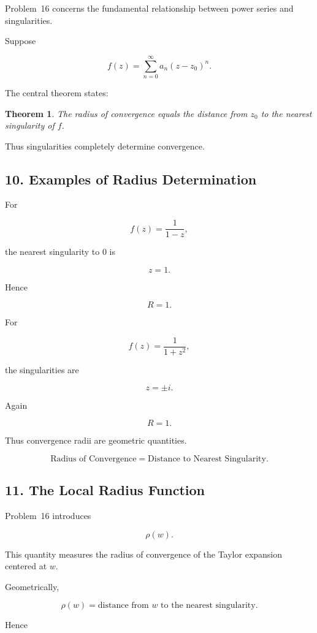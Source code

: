 \documentclass[12pt,a4paper]{article}
\newtheorem{theorem}{Theorem}[section]
\theoremstyle{notespace}
\begin{document}
Problem~16 concerns the fundamental relationship between power series and singularities.

Suppose

\[
f(z)
=
\sum_{n=0}^{\infty}
a_n(z-z_0)^n.
\]

The central theorem states:

\begin{theorem}
	The radius of convergence equals the distance from \(z_0\) to the nearest singularity of \(f\).
\end{theorem}

Thus singularities completely determine convergence.

\bigskip

\subsection{10. Examples of Radius Determination}

For

\[
f(z)=\frac1{1-z},
\]

the nearest singularity to \(0\) is

\[
z=1.
\]

Hence

\[
R=1.
\]

For

\[
f(z)=\frac1{1+z^2},
\]

the singularities are

\[
z=\pm i.
\]

Again

\[
R=1.
\]

Thus convergence radii are geometric quantities.

\[
\boxed{
	\text{Radius of Convergence}
	=
	\text{Distance to Nearest Singularity}.
}
\]

\bigskip

\subsection{11. The Local Radius Function}

Problem~16 introduces

\[
\rho(w).
\]

This quantity measures the radius of convergence of the Taylor expansion centered at \(w\).

Geometrically,

\[
\rho(w)
=
\text{distance from }w
\text{ to the nearest singularity}.
\]

Hence
\end{document}
